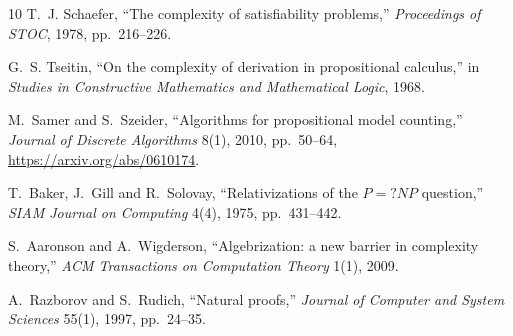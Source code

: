 \documentclass[11pt]{article}
\begin{document}
\begin{thebibliography}{10}
T.~J. Schaefer, ``The complexity of satisfiability problems,''
\emph{Proceedings of STOC}, 1978, pp.~216--226.

G.~S. Tseitin, ``On the complexity of derivation in propositional calculus,''
in \emph{Studies in Constructive Mathematics and Mathematical Logic}, 1968.

M.~Samer and S.~Szeider, ``Algorithms for propositional model counting,''
\emph{Journal of Discrete Algorithms} 8(1), 2010, pp.~50--64,
\url{https://arxiv.org/abs/0610174}.

T.~Baker, J.~Gill and R.~Solovay, ``Relativizations of the $P=?NP$ question,''
\emph{SIAM Journal on Computing} 4(4), 1975, pp.~431--442.

S.~Aaronson and A.~Wigderson, ``Algebrization: a new barrier in complexity
theory,'' \emph{ACM Transactions on Computation Theory} 1(1), 2009.

A.~Razborov and S.~Rudich, ``Natural proofs,'' \emph{Journal of Computer and
System Sciences} 55(1), 1997, pp.~24--35.
\end{thebibliography}

\end{document}
